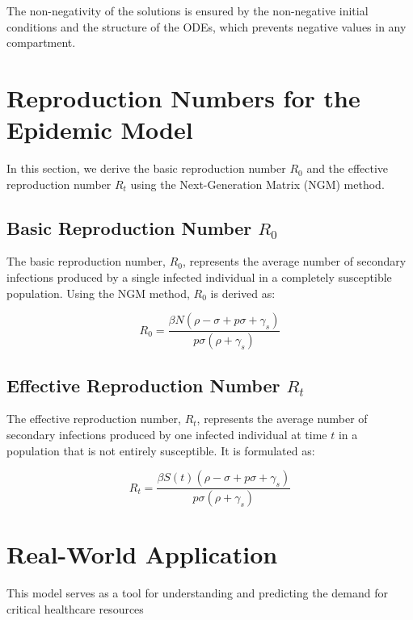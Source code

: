 \documentclass[lettersize, journal]{IEEEtran}
\begin{document}
The non-negativity of the solutions is ensured by the non-negative initial conditions and the structure of the ODEs, which prevents negative values in any compartment.

\section{Reproduction Numbers for the Epidemic Model}
In this section, we derive the basic reproduction number \( R_0 \) and the effective reproduction number \( R_t \) using the Next-Generation Matrix (NGM) method.

\subsection{Basic Reproduction Number \( R_0 \)}
The basic reproduction number, \( R_0 \), represents the average number of secondary infections produced by a single infected individual in a completely susceptible population. Using the NGM method, \( R_0 \) is derived as:

\[ R_0 = \frac{\beta N ( \rho - \sigma + p \sigma + \gamma_s )}{p \sigma ( \rho + \gamma_s )} \]

\subsection{Effective Reproduction Number \( R_t \)}
The effective reproduction number, \( R_t \), represents the average number of secondary infections produced by one infected individual at time \( t \) in a population that is not entirely susceptible. It is formulated as:

\[ R_t = \frac{\beta S(t) ( \rho - \sigma + p \sigma + \gamma_s )}{p \sigma ( \rho + \gamma_s )} \]

\section{Real-World Application}
This model serves as a tool for understanding and predicting the demand for critical healthcare resources
\end{document}
